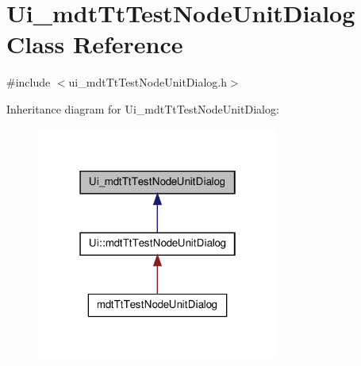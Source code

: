 \hypertarget{class_ui__mdt_tt_test_node_unit_dialog}{\section{Ui\-\_\-mdt\-Tt\-Test\-Node\-Unit\-Dialog Class Reference}
\label{class_ui__mdt_tt_test_node_unit_dialog}
}


{\ttfamily \#include $<$ui\-\_\-mdt\-Tt\-Test\-Node\-Unit\-Dialog.\-h$>$}



Inheritance diagram for Ui\-\_\-mdt\-Tt\-Test\-Node\-Unit\-Dialog\-:\nopagebreak
\begin{figure}[H]
\begin{center}
\leavevmode
\includegraphics[width=226pt]{class_ui__mdt_tt_test_node_unit_dialog__inherit__graph}
\end{center}
\end{figure}


